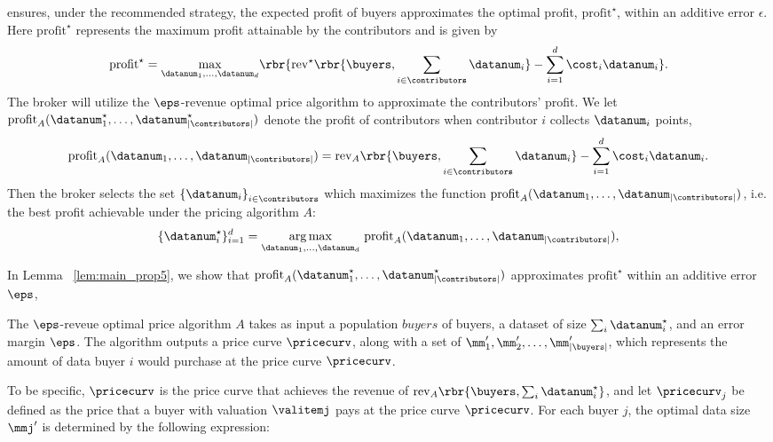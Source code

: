ensures, under the recommended strategy, the expected profit of buyers approximates the optimal profit, $ \mathrm{profit}^{\star}$, within an additive error $ \epsilon $. Here $ \mathrm{profit}^{\star} $ represents the maximum profit attainable by the contributors and is given by
\begin{equation*}
    \mathrm{profit}^{\star} = 
    \underset{\datanum_1,\dots,\datanum_d}{\max}
    \rbr{
        \mathrm{rev}^{\star} 
        \rbr{ 
            \buyers,\sum_{i \in \contributors}\datanum_i
        }
        - \sum_{i=1}^{d} \cost_i \datanum_i  
    }.
\end{equation*}
The broker will utilize the $\eps$-revenue optimal price algorithm to approximate the contributors' profit. We let $\mathrm{profit}_A( \datanum_1^{\star},\dots,\datanum_{|\contributors|}^{\star})$ denote the profit of contributors when contributor $i$ collects $\datanum_i$ points,
\begin{equation} 
    \label{eq:profit_A}
    \mathrm{profit}_A(  \datanum_1,\dots, \datanum_{|\contributors|})
    =
    \mathrm{rev}_A \rbr{
        \buyers, \sum_{i \in \contributors}\datanum_i
    } 
    -\sum_{i=1}^{d} \cost_i \datanum_i .
\end{equation}
Then the broker selects the set $\left\{ \datanum_i \right\}_{i \in \contributors}$ which maximizes the function $\mathrm{profit}_A(  \datanum_1,\dots, \datanum_{|\contributors|})$, i.e. the best profit achievable under the pricing algorithm $A$:
\begin{align} \label{eq:n_i_star}
    \{ \datanum_i^{\star} \}_{i=1}^d = \underset{\datanum_1,\dots,\datanum_d}{\arg\max}\ \mathrm{profit}_A( \datanum_1,\dots,\datanum_{|\contributors|}),
\end{align}
         
In Lemma 
~\ref{lem:main_prop5}, 
we show that $\mathrm{profit}_A(  \datanum_1^{\star},\dots, \datanum_{|\contributors|}^{\star})$ approximates $\mathrm{profit}^{\star}$ within an additive error $\eps$,    




The $\eps$-reveue optimal price algorithm $A$ takes as input  a population $buyers$ of buyers, a dataset of size $\sum_i \datanum_i^{\star}$, and an error
margin $\eps$. The algorithm outputs a price curve $\pricecurv$, along with a set of \( \mm'_1, \mm'_2, \ldots, \mm'_{|\buyers|} \), which represents the amount of data buyer \( i \) would purchase at the price curve $\pricecurv$. 

To be specific, $\pricecurv$ is the price curve that achieves the revenue of $\mathrm{rev}_A
\rbr{ \buyers,\sum_i {\datanum}_i^{\star}}$, and let $\pricecurv_j$ be defined as the price that a buyer with valuation $\valitemj$ pays at the price curve $\pricecurv$. For each buyer $j$, the optimal data size $\mmj'$ is determined by the following expression:

